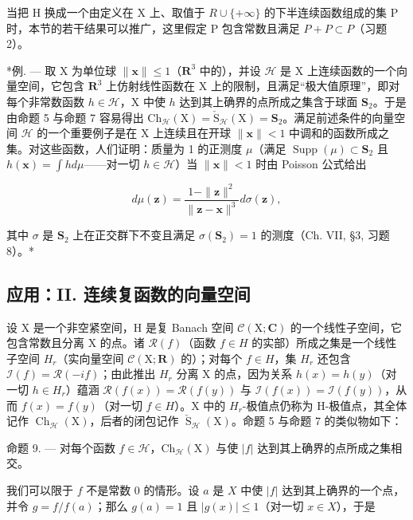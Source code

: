 当把 H 换成一个由定义在 X 上、取值于 \(R \cup \{+\infty\}\) 的下半连续函数组成的集 P 时，本节的若干结果可以推广，这里假定 P 包含常数且满足 \(P + P \subset P\)（习题 2）。

*例. --- 取 X 为单位球 \(\| \mathbf{x} \| \leqslant 1\)（\(\mathbf{R}^3\) 中的），并设 \(\mathcal{H}\) 是 X 上连续函数的一个向量空间，它包含 \(\mathbf{R}^3\) 上仿射线性函数在 X 上的限制，且满足“极大值原理”，即对每个非常数函数 \(h \in \mathcal{H}\)，X 中使 \(h\) 达到其上确界的点所成之集含于球面 \(\mathbf{S}_2\)。于是由命题 5 与命题 7 容易得出 \(\mathrm{Ch}_{\mathcal{H}}(\mathrm{X}) = \check{\mathrm{S}}_{\mathcal{H}}(\mathrm{X}) = \mathbf{S}_2\)。满足前述条件的向量空间 \(\mathcal{H}\) 的一个重要例子是在 X 上连续且在开球 \(\| \mathbf{x} \| < 1\) 中调和的函数所成之集。对这些函数，人们证明：质量为 1 的正测度 \(\mu\)（满足 \(\operatorname{Supp}(\mu) \subset \mathbf{S}_2\) 且 \(h(\mathbf{x}) = \int h d\mu\)——对一切 \(h \in \mathcal{H}\)）当 \(\| \mathbf{x} \| < 1\) 时由 Poisson 公式给出

\[
d \mu (\mathbf {z}) = \frac {1 - \| \mathbf {z} \| ^ {2}}{\| \mathbf {z} - \mathbf {x} \| ^ {3}} d \sigma (\mathbf {z}),
\]

其中 \(\sigma\) 是 \(\mathbf{S}_2\) 上在正交群下不变且满足 \(\sigma(\mathbf{S}_2) = 1\) 的测度（Ch. VII, §3, 习题 8）。*

\subsection{应用：II. 连续复函数的向量空间}

设 X 是一个非空紧空间，H 是复 Banach 空间 \(\mathcal{C}(\mathrm{X};\mathbf{C})\) 的一个线性子空间，它包含常数且分离 X 的点。诸 \(\mathcal{R}(f)\)（函数 \(f \in H\) 的实部）所成之集是一个线性子空间 \(H_{r}\)（实向量空间 \(\mathcal{C}(\mathrm{X};\mathbf{R})\) 的）；对每个 \(f \in H\)，集 \(H_{r}\) 还包含 \(\mathcal{I}(f) = \mathcal{R}(-if)\)；由此推出 \(H_{r}\) 分离 X 的点，因为关系 \(h(x) = h(y)\)（对一切 \(h \in H_{r}\)）蕴涵 \(\mathcal{R}(f(x)) = \mathcal{R}(f(y))\) 与 \(\mathcal{I}(f(x)) = \mathcal{I}(f(y))\)，从而 \(f(x) = f(y)\)（对一切 \(f \in H\)）。X 中的 \(H_{r}\)-极值点仍称为 H-极值点，其全体记作 \(\operatorname{Ch}_{\mathcal{H}}(\mathrm{X})\)，后者的闭包记作 \(\check{\operatorname{S}}_{\mathcal{H}}(\mathrm{X})\)。命题 5 与命题 7 的类似物如下：

命题 9. --- 对每个函数 \(f \in \mathcal{H}\)，\(\mathrm{Ch}_{\mathcal{H}}(\mathrm{X})\) 与使 \(|f|\) 达到其上确界的点所成之集相交。

我们可以限于 \(f\) 不是常数 0 的情形。设 \(a\) 是 \(X\) 中使 \(|f|\) 达到其上确界的一个点，并令 \(g = f / f(a)\)；那么 \(g(a) = 1\) 且 \(|g(x)| \leqslant 1\)（对一切 \(x \in X\)），于是

